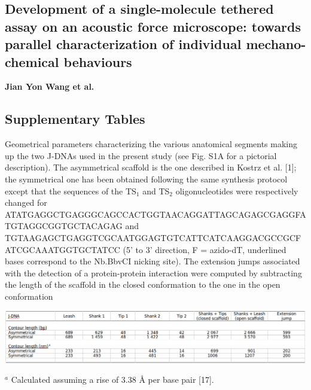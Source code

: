 \documentclass{biophys-new}
\begin{document}
\subsection*{Development of a single-molecule tethered assay on an acoustic force microscope: towards parallel characterization of individual mechano-chemical behaviours}

\textbf{ Jian Yon Wang et al.}


\setcounter{figure}{0}
\makeatletter 
\renewcommand{\thefigure}{S\@arabic\c@figure}
\makeatother
\setcounter{table}{0}
\makeatletter 
\renewcommand{\thetable}{S\@arabic\c@table}
\makeatother

\subsection*{Supplementary Tables}

\begin{table}[hbt!] %
	\caption{Geometrical parameters characterizing the various anatomical segments making up the two J-DNAs used in the present study (see Fig. S1A for a pictorial description). The asymmetrical scaffold is the one described in Kostrz et al. [1]; the symmetrical one has been obtained following the same synthesis protocol except that the sequences of the TS$_1$ and TS$_2$ oligonucleotides were respectively changed for
		ATATGAGGCTGAGGGCAGCCACTGGTAACAGGATTAGCAGAGCGAGGFATGTAGGCGGTGCTACAGAG
		and \\
		TGTAAGAGCTGAGGTCGCAATGGAGTGTCATTCATCAAGGACGCCGCFATCGCAAATGGTGCTATCC (5’ to 3’ direction, F = azido-dT, underlined bases correspond to the Nb.BbvCI nicking site). The extension jumps associated with the detection of a protein-protein interaction were computed by subtracting the length of the scaffold in the closed conformation to the one in the open conformation}
	\label{tbl:s1}
	\includegraphics[width=\linewidth]{Figures/TableS1.png}
\end{table}

\noindent
$^a$ Calculated assuming a rise of 3.38 Å per base pair [17].\\
\end{document}

